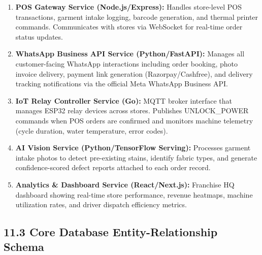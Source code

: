 \documentclass[11pt,a4paper]{article}
\begin{document}
\begin{enumerate}
    \item \textbf{POS Gateway Service (Node.js/Express):} Handles store-level POS transactions, garment intake logging, barcode generation, and thermal printer commands. Communicates with stores via WebSocket for real-time order status updates.
    \item \textbf{WhatsApp Business API Service (Python/FastAPI):} Manages all customer-facing WhatsApp interactions including order booking, photo invoice delivery, payment link generation (Razorpay/Cashfree), and delivery tracking notifications via the official Meta WhatsApp Business API.
    \item \textbf{IoT Relay Controller Service (Go):} MQTT broker interface that manages ESP32 relay devices across stores. Publishes UNLOCK\_POWER commands when POS orders are confirmed and monitors machine telemetry (cycle duration, water temperature, error codes).
    \item \textbf{AI Vision Service (Python/TensorFlow Serving):} Processes garment intake photos to detect pre-existing stains, identify fabric types, and generate confidence-scored defect reports attached to each order record.
    \item \textbf{Analytics \& Dashboard Service (React/Next.js):} Franchise HQ dashboard showing real-time store performance, revenue heatmaps, machine utilization rates, and driver dispatch efficiency metrics.
\end{enumerate}

\subsection{11.3 Core Database Entity-Relationship Schema}
\end{document}
